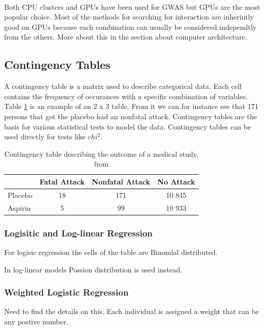 \documentclass[10pt,a4paper]{article}
\begin{document}
\\
Both CPU clusters\cite{biforce} and GPUs\cite{gwis,gboost,gmdr_gpu,cuda_lr,genie_2012} have been used for GWAS but GPUs are the most popular choice. Most of the methods for searching for interaction are inherintly good on GPUs because each combination can usually be considered independtly from the others. More about this in the section about computer architecture.

\subsection{Contingency Tables}
A contingency table is a matrix used to describe categorical data. Each cell contains the frequency of occurances with a specific combination of variables. Table \ref{table:contingency_table} is an example of an 2 x 3 table. From it we can for instance see that 171 persons that got the placebo had an nonfatal attack. Contingency tables are the basis for various statistical tests to model the data. Contingency tables can be used directly for tests like $chi^2$. \cite{agresti_categorical}

\begin{table}[h]
\begin{tabular}{ l c c c }
  \hline
  & Fatal Attack & Nonfatal Attack & No Attack\\
  \hline
  Placebo & 18 & 171 & 10 845 \\
  Aspirin & 5 & 99 & 10 933 \\
  \hline  
\end{tabular}
\caption{Contingency table describing the outcome of a medical study, from \cite{agresti_categorical}}
\label{table:contingency_table}
\end{table}

\subsubsection{Logisitic and Log-linear Regression}
For logisic regression the cells of the table are Binomial distributed.\cite{agresti_categorical}

In log-linear models Possion distribution is used instead. \cite{agresti_categorical}

\subsubsection{Weighted Logistic Regression}
Need to find the details on this. Each individual is assigned a weight that can be any postive number. 
\end{document}
